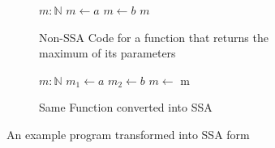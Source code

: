 \begin{figure}[h]
    \begin{subfigure}[b]{0.5\textwidth}
        \centering
        \begin{algorithmic}
            \State $m: \mathbb{N}$
            \State $m \gets a$
            \Else
            \State $m \gets b$
            \EndIf
            \State \Return $m$
            \EndFunction
        \end{algorithmic}
        \caption{Non-SSA Code for a function that returns the maximum of its parameters}
    \end{subfigure}
    \begin{subfigure}[b]{0.5\textwidth}
        \centering
        \begin{algorithmic}
            \State $m: \mathbb{N}$
            \State $m_1 \gets a$
            \Else
            \State $m_2 \gets b$
            \EndIf
            \State $m \gets$ 
            \State \Return m
            \EndFunction
        \end{algorithmic}
        \caption{Same Function converted into SSA}
    \end{subfigure}
    \caption{An example program transformed into SSA form}
    \label{fig:basics:SSA-phi}
\end{figure}